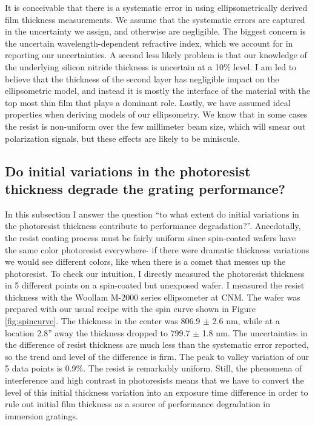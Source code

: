 It is conceivable that there is a systematic error in using ellipsometrically derived film thickness measurements.  We assume that the systematic errors are captured in the uncertainty we assign, and otherwise are negligible.  The biggest concern is the uncertain wavelength-dependent refractive index, which we account for in reporting our uncertainties.  A second less likely problem is that our knowledge of the underlying silicon nitride thickness is uncertain at a 10\% level.  I am led to believe that the thickness of the second layer has negligible impact on the ellipsometric model, and instead it is mostly the interface of the material with the top most thin film that plays a dominant role.  Lastly, we have assumed ideal properties when deriving models of our ellipsometry.  We know that in some cases the resist is non-uniform over the few millimeter beam size, which will smear out polarization signals, but these effects are likely to be miniscule.

\subsection{Do initial variations in the photoresist thickness degrade the grating performance?}
In this subsection I answer the question ``to what extent do initial variations in the photoresist thickness contribute to performance degradation?''.  Anecdotally, the resist coating process must be fairly uniform since spin-coated wafers have the same color photoresist everywhere- if there were dramatic thickness variations we would see different colors, like when there is a comet that messes up the photoresist.  To check our intuition, I directly measured the photoresist thickness in 5 different points on a spin-coated but unexposed wafer.  I measured the resist thickness with the Woollam M-2000 series ellipsometer at CNM.  The wafer was prepared with our usual recipe with the spin curve shown in Figure \ref{fig:spincurve}.  The thickness in the center was 806.9 $\pm$ 2.6 nm, while at a location 2.8'' away the thickness dropped to 799.7 $\pm$ 1.8 nm.  The uncertainties in the difference of resist thickness are much less than the systematic error reported, so the trend and level of the difference is firm.  The peak to valley variation of our 5 data points is 0.9\%.  The resist is remarkably uniform.  Still, the phenomena of interference and high contrast in photoresists means that we have to convert the level of this initial thickness variation into an exposure time difference in order to rule out initial film thickness as a source of performance degradation in immersion gratings.

